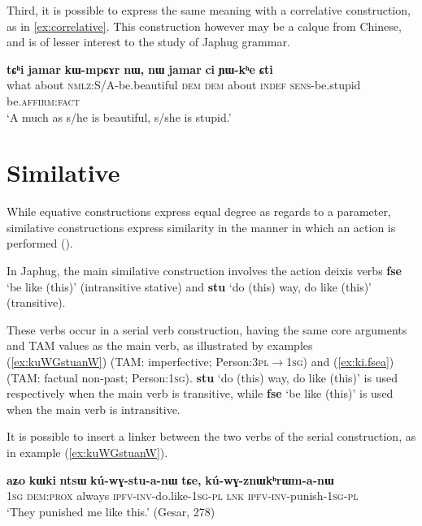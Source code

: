 \documentclass[oneside,a4paper,11pt]{article}
\newcommand{\ipa}[1]{{\phon\textbf{#1}}} %
\begin{document}
Third, it is possible to express the same meaning with a correlative construction, as in \ref{ex:correlative}. This construction however may be a calque from Chinese, and is of lesser interest to the study of Japhug grammar.

\begin{exe}
\ex \label{ex:correlative}
\gll 
\ipa{tɕʰi} 	\ipa{jamar} 	\ipa{kɯ-mpɕɤr} 	\ipa{nɯ,} 	\ipa{nɯ} 	\ipa{jamar} 	\ipa{ci} 	\ipa{ɲɯ-kʰe} 	\ipa{ɕti} \\
what about \textsc{nmlz}:S/A-be.beautiful \textsc{dem} \textsc{dem} about \textsc{indef} \textsc{sens}-be.stupid be.\textsc{affirm:fact} \\
\glt `A much as s/he is beautiful, s/she is stupid.'
\end{exe}

\section{Similative} \label{sec:similative}
While equative constructions express equal degree as regards to a parameter, similative constructions express similarity in the manner in which an action is performed (\citealt{haspelmath08equative}).

In Japhug, the main similative construction involves the action deixis verbs \ipa{fse} `be like (this)' (intransitive stative) and \ipa{stu} `do (this) way, do like (this)' (transitive).

These verbs occur in a serial verb construction, having the same core arguments and TAM values as the main verb, as illustrated by examples (\ref{ex:kuWGstuanW}) (TAM: imperfective; Person:\textsc{3pl$\rightarrow$1sg}) and (\ref{ex:ki.fsea}) (TAM: factual non-past; Person:\textsc{1sg}). \ipa{stu} `do (this) way, do like (this)' is used respectively when the main verb is transitive, while \ipa{fse} `be like (this)' is used when the main verb is intransitive.

It is possible to insert a linker between the two verbs of the serial construction, as in example (\ref{ex:kuWGstuanW}). 

\begin{exe}
\ex \label{ex:kuWGstuanW}
\gll 	
 \ipa{aʑo} 	\ipa{kɯki} 	\ipa{ntsɯ} 	\ipa{kú-wɣ-stu-a-nɯ} 	\ipa{tɕe,} 	\ipa{kú-wɣ-znɯkʰrɯm-a-nɯ} \\
 \textsc{1sg} \textsc{dem:prox} always \textsc{ipfv-inv}-do.like-\textsc{1sg-pl} \textsc{lnk} \textsc{ipfv-inv}-punish-\textsc{1sg-pl} \\
 \glt `They punished me like this.' (Gesar, 278)
\end{exe}	
\end{document}
